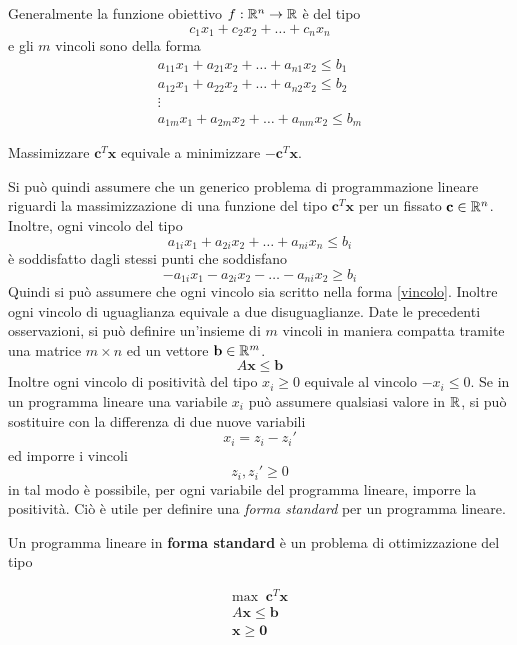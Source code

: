 \documentclass[10pt, letterpaper]{report}
\begin{document}
Generalmente la funzione obiettivo  $f:{\mathbb R}^n\rightarrow {\mathbb R}$ è del tipo 
$$c_1x_1+c_2x_2+\dots+c_nx_n $$
e gli $m$ vincoli sono della forma $$\begin{matrix}
    a_{11}x_1+a_{21}x_2+\dots + a_{n1}x_2\le b_1\\ 
    a_{12}x_1+a_{22}x_2+\dots + a_{n2}x_2\le b_2\\ \vdots \\ 
    a_{1m}x_1+a_{2m}x_2+\dots + a_{nm}x_2\le b_m
\end{matrix}$$
\begin{osservazione}
    Massimizzare  $\mathbf c^T \mathbf x$ equivale a minimizzare $\mathbf -\mathbf c^T\mathbf x $.
\end{osservazione}
Si può quindi assumere che un generico problema di programmazione lineare riguardi la massimizzazione di una funzione del tipo $\mathbf c^T \mathbf x$ per un fissato $\mathbf c \in {\mathbb R}^n$. Inoltre, ogni vincolo del tipo 
\begin{equation}\label{vincolo} a_{1i}x_1+a_{2i}x_2+\dots + a_{ni}x_n\le b_i\end{equation}
è soddisfatto dagli stessi punti che soddisfano 
$$ -a_{1i}x_1-a_{2i}x_2-\dots - a_{ni}x_2\ge b_i $$
Quindi si può assumere che ogni vincolo sia scritto nella forma \ref{vincolo}. Inoltre ogni vincolo di uguaglianza equivale a due disuguaglianze. Date le precedenti osservazioni, si può definire un'insieme di $m$ vincoli in maniera compatta tramite una matrice $m\times n $ ed un vettore $\mathbf b\in {\mathbb R}^m$. 
$$ A\mathbf x \le \mathbf b$$ 
Inoltre ogni vincolo di positività del tipo $x_i\ge 0$ equivale al vincolo $-x_i\le 0$. Se in un programma lineare una variabile $x_i$ può assumere qualsiasi valore in ${\mathbb R}$, si può sostituire con la differenza di due nuove variabili 
$$x_i=z_i-z_i' $$
ed imporre i vincoli $$ z_i,z_i'\ge 0$$ 
in tal modo è possibile, per ogni variabile del programma lineare, imporre la positività. Ciò è utile per definire una \textit{forma standard} per un programma lineare. 
\begin{definizione}\label{formaStandard}
    Un programma lineare in \textbf{forma standard} è un problema di ottimizzazione del tipo 
\end{definizione}
    $$
    \begin{matrix}
        \text{max } \ \mathbf c^T\mathbf x\\ 
        A\mathbf x \le \mathbf b\\ 
        \mathbf x \ge \mathbf  0
    \end{matrix}
    $$
\end{document}
